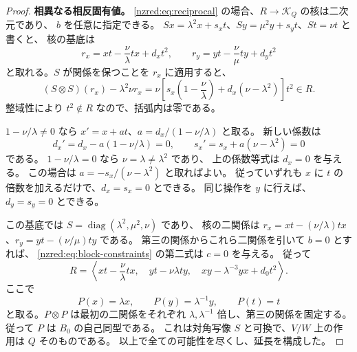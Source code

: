 \documentclass[11pt,a4paper]{ltjsarticle}
\theoremstyle{definition}
\begin{document}
\begin{proof}
\par\smallskip\noindent\textbf{相異なる相反固有値。}\quad
\eqref{nzred:eq:reciprocal} の場合、$R\to\mathcal K_Q$ の核は二次元であり、
$b$ を任意に指定できる。
$Sx=\lambda^2x+s_x t$、$Sy=\mu^2y+s_y t$、$St=\nu t$ と書くと、
核の基底は
\[
r_x=xt-\frac\nu\lambda tx+d_x t^2,\qquad
r_y=yt-\frac\nu\mu ty+d_y t^2
\]
と取れる。$S$ が関係を保つことを $r_x$ に適用すると、
\[
(S\otimes S)(r_x)-\lambda^2\nu r_x
=\nu\left[s_x\left(1-\frac\nu\lambda\right)
  +d_x(\nu-\lambda^2)\right]t^2\in R.
\]
整域性により $t^2\notin R$ なので、括弧内は零である。

$1-\nu/\lambda\ne0$ なら
$x'=x+a t$、$a=d_x/(1-\nu/\lambda)$ と取る。
新しい係数は
\[
d_x'=d_x-a(1-\nu/\lambda)=0,\qquad
s_x'=s_x+a(\nu-\lambda^2)=0
\]
である。
$1-\nu/\lambda=0$ なら $\nu=\lambda\ne\lambda^2$ であり、
上の係数等式は $d_x=0$ を与える。
この場合は $a=-s_x/(\nu-\lambda^2)$ と取ればよい。
従っていずれも $x$ に $t$ の倍数を加えるだけで、$d_x=s_x=0$ とできる。
同じ操作を $y$ に行えば、$d_y=s_y=0$ とできる。

この基底では $S=\operatorname{diag}(\lambda^2,\mu^2,\nu)$ であり、
核の二関係は $r_x=xt-(\nu/\lambda)tx$、$r_y=yt-(\nu/\mu)ty$ である。
第三の関係からこれら二関係を引いて $b=0$ とすれば、
\eqref{nzred:eq:block-constraints} の第二式は $c=0$ を与える。
従って
\[
R=\left\langle
xt-\frac\nu\lambda tx,\quad
yt-\nu\lambda ty,\quad
xy-\lambda^{-3}yx+d_0t^2
\right\rangle.
\]
ここで
\[
P(x)=\lambda x,\qquad P(y)=\lambda^{-1}y,\qquad P(t)=t
\]
と取る。$P\otimes P$ は最初の二関係をそれぞれ
$\lambda,\lambda^{-1}$ 倍し、第三の関係を固定する。
従って $P$ は $B_0$ の自己同型である。
これは対角写像 $S$ と可換で、$V/W$ 上の作用は $Q$ そのものである。
以上で全ての可能性を尽くし、延長を構成した。
\end{proof}
\end{document}

